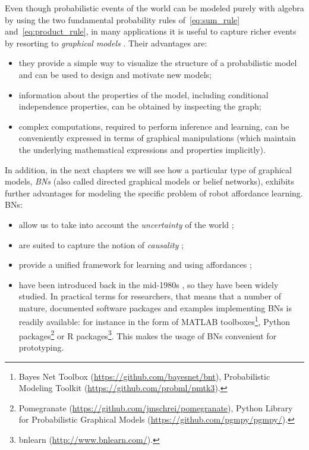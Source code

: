 Even though probabilistic events of the world can be modeled purely with algebra by using the two fundamental probability rules of~\eqref{eq:sum_rule} and~\eqref{eq:product_rule}, in many applications it is useful to capture richer events by resorting to \emph{graphical models} \cite[Ch.~8]{bishop:prml}.
Their advantages are:
\begin{itemize}
    \item they provide a simple way to visualize the structure of a probabilistic model and can be used to design and motivate new models;

    \item information about the properties of the model, including conditional independence properties, can be obtained by inspecting the graph;

    \item complex computations, required to perform inference and learning, can be conveniently expressed in terms of graphical manipulations (which maintain the underlying mathematical expressions and properties implicitly).
\end{itemize}

In addition, in the next chapters we will see how a particular type of graphical models, \emph{\aclp{BN}} \cite{pearl:1988:probabilistic,jensen:1996:intro_bn} (also called directed graphical models or belief networks), exhibits further advantages for modeling the specific problem of robot affordance learning.
\acfp{BN}:
\begin{itemize}
    \item allow us to take into account the \emph{uncertainty} of the world \cite[Ch.~14, Probabilistic Reasoning]{russell_norvig:ai3};

    \item are suited to capture the notion of \emph{causality} \cite[p.~366]{bishop:prml};

    \item provide a unified framework for learning and using affordances \cite{montesano:2008};

    \item have been introduced back in the mid-1980s \cite{pearl:1988:probabilistic}, so they have been widely studied.
    In practical terms for researchers, that means that a number of mature, documented software packages and examples implementing \acp{BN} is readily available: for instance in the form of MATLAB toolboxes\footnote{Bayes Net Toolbox (\url{https://github.com/bayesnet/bnt}), Probabilistic \allowbreak Modeling Toolkit (\url{https://github.com/probml/pmtk3}).}, Python packages\footnote{Pomegranate (\url{https://github.com/jmschrei/pomegranate}), Python Library for Probabilistic Graphical Models (\url{https://github.com/pgmpy/pgmpy/}).} or R packages\footnote{bnlearn (\url{http://www.bnlearn.com/}).}.
    This makes the usage of \acp{BN} convenient for prototyping.
\end{itemize}

